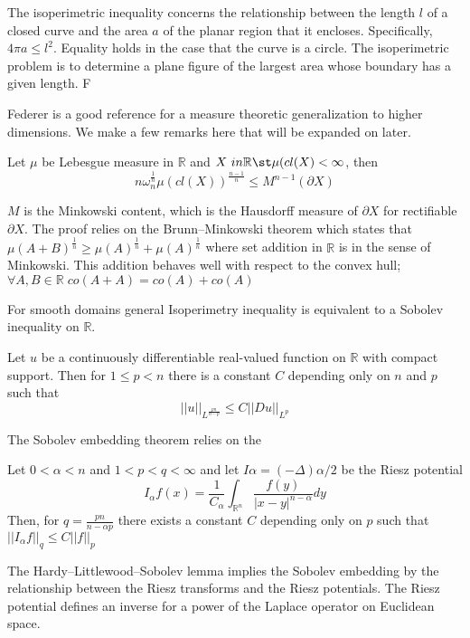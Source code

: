 The isoperimetric inequality concerns the relationship between the length $l$ of a closed curve and the area $a$ of the planar region that it encloses.  Specifically, $4 \pi a \leq l^2$.  Equality holds in the case that the curve is a circle. The isoperimetric problem is to determine a plane figure of the largest area whose boundary has a given length. F

Federer \cite{federer1996geometric} is a good reference for a measure theoretic generalization to higher dimensions. We make a few remarks here that will be expanded on later.
\begin{prop}
Let $\mu$ be Lebesgue measure in $\mathbb{R}$ and $X \ in \mathbb{R} \st \mu(cl(X) < \infty$, then
\begin{equation*}
  n \omega^{\frac{1}{n}}_{n} \mu(cl(X))^{\frac{n-1}{n}} \leq M^{n-1}(\partial X)
\end{equation*}
\end{prop}
$M$ is the Minkowski content, which is  the Hausdorff measure of $\partial X$ for rectifiable $\partial X$.
The proof relies on the Brunn–Minkowski theorem which states that $\mu(A+B)^{\frac{1}{n}} \geq \mu(A)^{\frac{1}{n}} + \mu(A)^{\frac{1}{n}}$ where set addition in $\mathbb{R}$ is in the sense of Minkowski.  This addition behaves well with respect to the convex hull; $\forall A,B \in \mathbb{R} \; co(A + A) = co(A) + co(A)$

For smooth domains general Isoperimetry inequality is equivalent to a Sobolev inequality on $\mathbb{R}$.

\begin{prop}
Let $u$ be a continuously differentiable real-valued function on $\mathbb{R}$ with compact support. Then for $1 \le p < n$ there is a constant $C$ depending only on $n$ and $p$ such that
\begin{equation*}
  ||u||_{L^{\frac{pn}{n-p}}} \leq C || Du||_{L^p}
\end{equation*}
\end{prop}

The Sobolev embedding theorem relies on the
\begin{thm}
Let $0 < \alpha <n$ and $1 < p  < q < \infty$ and let $I\alpha = (-\Delta)\alpha/2$ be the Riesz potential
\begin{equation*}
  I_\alpha f(x) = \frac{1}{C_\alpha}\int_{\mathbb{R}^n} \frac{f(y)}{|x-y|^{n-\alpha}} dy
\end{equation*}
Then, for $q=\frac{pn}{n-\alpha p}$
there exists a constant $C$ depending only on $p$ such that $||I_\alpha f||_q \leq C ||f||_p$
\end{thm}
The Hardy–Littlewood–Sobolev lemma implies the Sobolev embedding by the relationship between the Riesz transforms and the Riesz potentials.  The Riesz potential defines an inverse for a power of the Laplace operator on Euclidean space.


